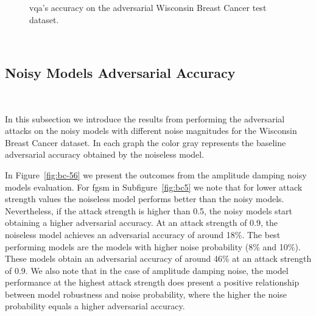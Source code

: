 \begin{figure}[!h]
  \caption{\ac{vqa}'s accuracy on the adversarial Wisconsin Breast Cancer test dataset.}
  \label{fig:bc-34}
\end{figure} \

\subsection{Noisy Models Adversarial Accuracy}\label{subsection:breast-cancer-noisy-adv-acc} \

In this subsection we introduce the results from performing
the adversarial attacks on the noisy models with different noise
magnitudes for the Wisconsin Breast Cancer dataset. In each graph
the color gray represents the baseline adversarial accuracy obtained
by the noiseless model. \

In Figure~\ref{fig:bc-56} we present the outcomes from the amplitude
damping noisy models evaluation. For \ac{fgsm} in Subfigure~\ref{fig:bc5}
we note that for lower attack strength values the noiseless model performs
better than the noisy models. Nevertheless, if the attack strength is
higher than 0.5, the noisy models start obtaining a higher adversarial
accuracy. At an attack strength of 0.9, the noiseless model achieves
an adversarial accuracy of around 18\%. The best performing models
are the models with higher noise probability (8\% and 10\%). These
models obtain an adversarial accuracy of around 46\% at an attack
strength of 0.9. We also note that in the case of amplitude damping
noise, the model performance at the highest attack strength does
present a positive relationship between model robustness and
noise probability, where the higher the noise probability equals
a higher adversarial accuracy. \

